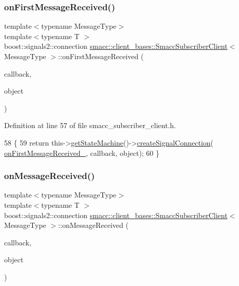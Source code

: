 \subsubsection{\texorpdfstring{on\+First\+Message\+Received()}{onFirstMessageReceived()}}
{\footnotesize\ttfamily template$<$typename Message\+Type$>$ \\
template$<$typename T $>$ \\
boost\+::signals2\+::connection \hyperlink{classsmacc_1_1client__bases_1_1SmaccSubscriberClient}{smacc\+::client\+\_\+bases\+::\+Smacc\+Subscriber\+Client}$<$ Message\+Type $>$\+::on\+First\+Message\+Received (\begin{DoxyParamCaption}\item[{void(T\+::$\ast$)(const Message\+Type \&)}]{callback,  }\item[{T $\ast$}]{object }\end{DoxyParamCaption})\hspace{0.3cm}{\ttfamily [inline]}}



Definition at line 57 of file smacc\+\_\+subscriber\+\_\+client.\+h.


\begin{DoxyCode}
58   \{
59     \textcolor{keywordflow}{return} this->\hyperlink{classsmacc_1_1ISmaccClient_aec51d4712404cb9882b86e4c854bb93a}{getStateMachine}()->\hyperlink{classsmacc_1_1ISmaccStateMachine_adf0f42ade0c65cc471960fe2a7c42da2}{createSignalConnection}(
      \hyperlink{classsmacc_1_1client__bases_1_1SmaccSubscriberClient_af1ec022065a2df3faabe40768f8b2e22}{onFirstMessageReceived\_}, callback, \textcolor{keywordtype}{object});
60   \}
\end{DoxyCode}
\mbox{\label{classsmacc_1_1client__bases_1_1SmaccSubscriberClient_a4f02251e3a161fb6d802b154b1081f18}} 
\subsubsection{\texorpdfstring{on\+Message\+Received()}{onMessageReceived()}}
{\footnotesize\ttfamily template$<$typename Message\+Type$>$ \\
template$<$typename T $>$ \\
boost\+::signals2\+::connection \hyperlink{classsmacc_1_1client__bases_1_1SmaccSubscriberClient}{smacc\+::client\+\_\+bases\+::\+Smacc\+Subscriber\+Client}$<$ Message\+Type $>$\+::on\+Message\+Received (\begin{DoxyParamCaption}\item[{void(T\+::$\ast$)(const Message\+Type \&)}]{callback,  }\item[{T $\ast$}]{object }\end{DoxyParamCaption})\hspace{0.3cm}{\ttfamily [inline]}}



